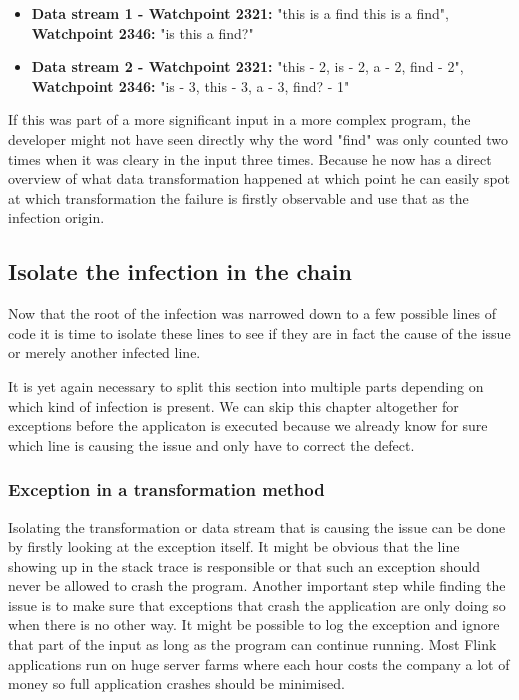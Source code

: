 \begin{itemize}
  \item \textbf{Data stream 1 - Watchpoint 2321:} "this is a find this is a find", \textbf{Watchpoint 2346:} "is this a find?"
  \item \textbf{Data stream 2 - Watchpoint 2321:} "this - 2, is - 2, a - 2, find - 2", \textbf{Watchpoint 2346:} "is - 3, this - 3, a - 3, find? - 1"
\end{itemize}

If this was part of a more significant input in a more complex program, the developer might not have seen directly why the word "find" was only counted two times when it was cleary in the input three times. Because he now has a direct overview of what data transformation happened at which point he can easily spot at which transformation the failure is firstly observable and use that as the infection origin.

\subsection{Isolate the infection in the chain}
\label{mdfIsolateInfection}
Now that the root of the infection was narrowed down to a few possible lines of code it is time to isolate these lines to see if they are in fact the cause of the issue or merely another infected line.

It is yet again necessary to split this section into multiple parts depending on which kind of infection is present. We can skip this chapter altogether for exceptions before the applicaton is executed because we already know for sure which line is causing the issue and only have to correct the defect.

\subsubsection{Exception in a transformation method}
Isolating the transformation or data stream that is causing the issue can be done by firstly looking at the exception itself. It might be obvious that the line showing up in the stack trace is responsible or that such an exception should never be allowed to crash the program. Another important step while finding the issue is to make sure that exceptions that crash the application are only doing so when there is no other way. It might be possible to log the exception and ignore that part of the input as long as the program can continue running. Most Flink applications run on huge server farms where each hour costs the company a lot of money so full application crashes should be minimised.

